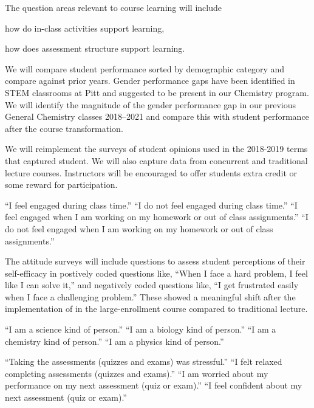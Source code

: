 \documentclass[10pt,letterpaper]{article}
\begin{document}
The question areas relevant to course learning will include
\begin{enumerate*}[label=\textbf{\arabic*.)}]
  \item how do in-class activities support learning,
\item how does assessment structure support learning.
\end{enumerate*}

 We will compare student performance sorted by demographic category and compare against prior years. Gender performance gaps have been identified in STEM classrooms at Pitt and suggested to be present in our Chemistry program. We will identify the magnitude of the gender performance gap in our previous General Chemistry classes 2018--2021 and compare this with student performance after the course transformation.

We will reimplement the surveys of student opinions used in the 2018-2019 terms that captured student.
We will also capture data from concurrent \pogil and traditional lecture courses. Instructors will be encouraged to offer students extra credit or some reward for participation.

``I feel engaged during class time.'' ``I do not feel engaged during class time.'' ``I feel engaged when I am working on my homework or out of class assignments.'' ``I do not feel engaged when I am working on my homework or out of class assignments.''


The attitude surveys will include questions to assess student perceptions of their self-efficacy in postively coded questions like, ``When I face a hard problem, I feel like I can solve it,'' and negatively coded questions like, ``I get frustrated easily when I face a challenging problem.'' These showed a meaningful shift after the implementation of \pogil  in the large-enrollment course compared to traditional lecture.

``I am a science kind of person.'' ``I am a biology kind of person.'' ``I am a chemistry kind of person.'' ``I am a physics kind of person.'' 

``Taking the assessments (quizzes and exams) was stressful.'' ``I felt relaxed completing assessments (quizzes and exams).'' ``I am worried about my performance on my next assessment (quiz or exam).'' ``I feel confident about my next assessment (quiz or exam).''
\end{document}
